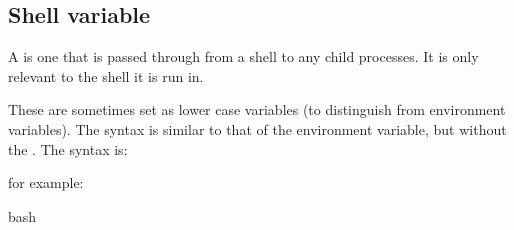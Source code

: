 \documentclass[letterpaper,10pt,english]{sphinxmanual}
\begin{document}
\begin{sphinxVerbatim}[commandchars=\\\{\}]

             
             
\end{sphinxVerbatim}


\subsection{Shell variable}
\label{\detokenize{Appendix1:Shell-variable}}
A  is one that is  passed through from a shell to any child processes. It is only relevant to the shell it is run in.

These are sometimes set as lower case variables (to distinguish from environment variables). The syntax is similar to that of the environment variable, but without the . The syntax is:

\begin{sphinxVerbatim}[commandchars=\\\{\}]
\end{sphinxVerbatim}

for example:

{
\begin{sphinxVerbatim}[commandchars=\\\{\}]
\llap{\color{nbsphinxin}[5]:\,\hspace{\fboxrule}\hspace{\fboxsep}}\PYGZpc{}\PYGZpc{}bash

 
\end{sphinxVerbatim}
}
\end{document}
